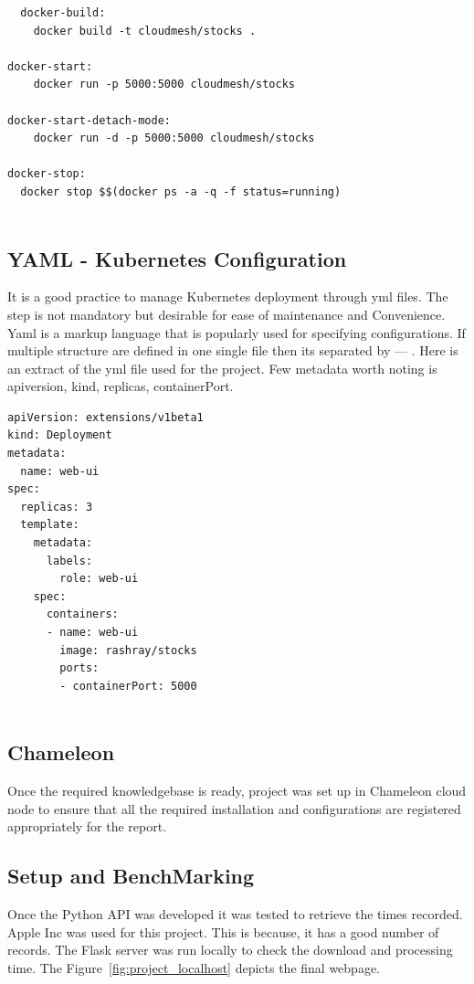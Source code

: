 \begin{verbatim}
  docker-build:
	docker build -t cloudmesh/stocks .
	
docker-start:
	docker run -p 5000:5000 cloudmesh/stocks
	
docker-start-detach-mode:
	docker run -d -p 5000:5000 cloudmesh/stocks

docker-stop:
  docker stop $$(docker ps -a -q -f status=running)
  
\end{verbatim}
\subsection{YAML - Kubernetes Configuration}
It is a good practice to manage Kubernetes deployment through yml files. The
step is not mandatory but desirable for ease of maintenance and Convenience.
Yaml is a markup language that is popularly used for specifying
configurations. If multiple structure are defined in one single file then its
separated by --- . Here is an extract of the yml file used for the project.
Few metadata worth noting is apiversion, kind, replicas, containerPort.

\begin{verbatim}
apiVersion: extensions/v1beta1
kind: Deployment
metadata:
  name: web-ui
spec:
  replicas: 3
  template:
    metadata:
      labels:
        role: web-ui
    spec:
      containers:
      - name: web-ui
        image: rashray/stocks
        ports:
        - containerPort: 5000
  
\end{verbatim}
\subsection{Chameleon}
Once the required knowledgebase is ready, project was set up in Chameleon
cloud node to ensure that all the required installation and configurations are
registered appropriately for the report.

\subsection{Setup and BenchMarking}

Once the Python API was developed it was tested to retrieve the times
recorded. Apple Inc was used for this project. This is because, it has a good
number of records. The Flask server was run locally to check the download and
processing time. The Figure~\ref{fig:project_localhost} depicts the final
webpage.

